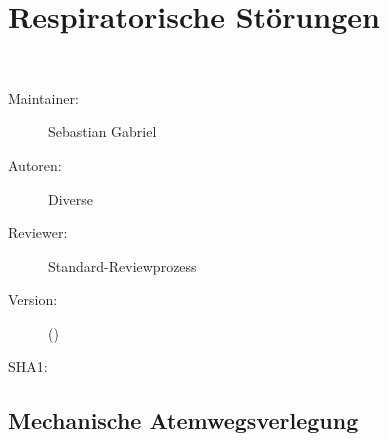 \def\ChapterCode{RSP}
\chapter
[\CO{[RSP]} Respiratorische Störungen]
{Respiratorische Störungen}
\label{topic:respiratorische-notfaelle}
\ChapterIntro
{%
~~~
}
{%
\begin{description}
  \item[Maintainer:] Sebastian Gabriel
  \item[Autoren:] Diverse
  \item[Reviewer:] Standard-Reviewprozess
  \item[Version:] {\DocVersion} ({\DocVersionInfo})
  \item[SHA1:] {\DocGitCommit}
\end{description}

{\TxTeilkapitelAASS}
}

% 

\clearpage
{}



\section{Mechanische Atemwegsverlegung}
\label{topic:mechanische-atemwegsverlegung}
\label{topic:fremdkoerperaspiration}



